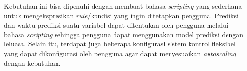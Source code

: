 \begin{enumerate}
    Kebutuhan ini bisa dipenuhi dengan membuat bahasa \textit{scripting} yang sederhana untuk mengekspresikan \textit{rule}/kondisi yang ingin ditetapkan pengguna. Prediksi dan waktu prediksi suatu variabel dapat ditentukan oleh pengguna melalui bahasa \textit{scripting} sehingga pengguna dapat menggunakan model prediksi dengan leluasa. Selain itu, terdapat juga beberapa konfigurasi sistem kontrol fleksibel yang dapat dikonfigurasi oleh pengguna agar dapat menyesuaikan \textit{autoscaling} dengan kebutuhan.



\end{enumerate}